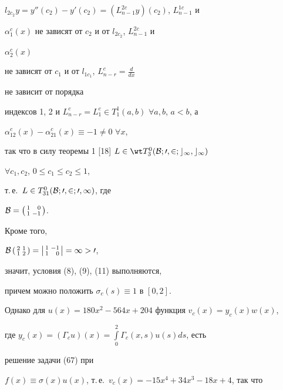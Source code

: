 $l_{2c_2}y=y''(c_2)-y'(c_2)=(L^{2c}_{n-1}y)(c_2)$, $L^{1c}_{n-1}$ и 


$\alpha^c_1(x)$ не зависят от $c_2$ и от $l_{2c_2}$, $L^{2c}_{n-1}$ и 


$\alpha^c_2(x)$ 


не зависят от $c_1$ и от $l_{1c_1}$, $L^c_{n-r}=\frac{d}{dx}$ 


не зависит от порядка 


индексов 1, 2 и $L^c_{n-r}=L^c_1\in T^1_1(a,b)$ $\forall a,b$, $a<b$, а 


$\alpha^c_{12}(x)-\alpha^c_{21}(x)\equiv-1\ne0$ $\forall x$, 


так что в силу теоремы 1 [18] $L\in\wt T^0_3(\cal B;0,2;c_1,c_1)$ 


$\forall c_1,c_2$, $0\le c_1\le c_2\le 1$, 


т.\,е.~$L\in T^0_{31}(\cal B;0,2;0,1)$, где 


$\cal B= 


\left(\begin{smallmatrix}


1 & \phantom{-}0 \\ 1 & -1\end{smallmatrix}\right)$. 


Кроме того, 


$\cal B 


\left(\begin{smallmatrix} 2 & 1 \\ 1 & 2\end{smallmatrix}\right)= 


\left|\begin{smallmatrix}


1 & -1 \\ 1 & \phantom{-}0\end{smallmatrix}\right| 


=1>0$, 


значит, условия (8), (9), (11) выполняются, 


причем можно положить $\sigma_c(s)\equiv1$ в $[0,2]$. 


 


Однако для $u(x)=180x^2-564x+204$ функция $v_c(x)=y_c(x)w(x)$, 


где $y_c(x)=(\Gamma_c u)(x)=\int\limits^2_0\Gamma_c(x,s)u(s)ds$, есть 


решение задачи (67) при 


$f(x)\equiv\sigma(x)u(x)$, т.\,е.~$v_c(x)=-15x^4+34x^3-18x+4$, так что 


